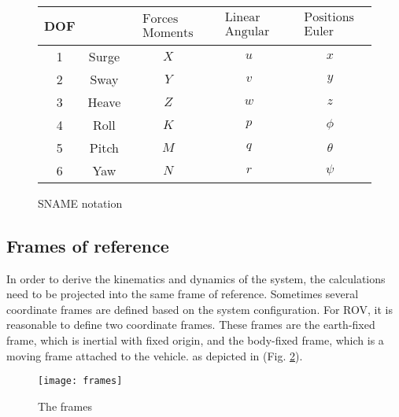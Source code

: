     \begin{figure}[H]
        \begin{tabular}{|c|c|c|c|c|}
            \hline DOF & & $\begin{array}{c}\text { Forces and } \\
            \text { Moments }\end{array}$ & $\begin{array}{c}\text { Linear and } \\
            \text { Angular velocity }\end{array}$ & $\begin{array}{c}\text { Positions and } \\
            \text { Euler Angles }\end{array}$ \\
            \hline
            1 & Surge & $X$ & $u$ & $x$ \\
            2 & Sway & $Y$ & $v$ & $y$ \\
            3 & Heave & $Z$ & $w$ & $z$ \\
            4 & Roll & $K$ & $p$ & $\phi$ \\
            5 & Pitch & $M$ & $q$ & $\theta$ \\
            6 & Yaw & $N$ & $r$ & $\psi$ \\
            \hline
        \end{tabular}
        \caption{SNAME notation}
        \label{table:sname}
    \end{figure}

\subsection{Frames of reference}

    In order to derive the kinematics and dynamics of the system, the calculations need to be projected into 
    the same frame of reference. 
    Sometimes several coordinate frames are defined based on the system configuration. 
    For ROV, it is reasonable to define two coordinate frames. 
    These frames are the earth-fixed frame, which is inertial with fixed origin, and the body-fixed frame, 
    which is a moving frame attached to the vehicle. as depicted in (Fig. \ref{image:frames}). 
    \begin{figure}[H]
        \centering\texttt{[image: frames]}
        \caption{The frames}
        \label{image:frames}
    \end{figure}

